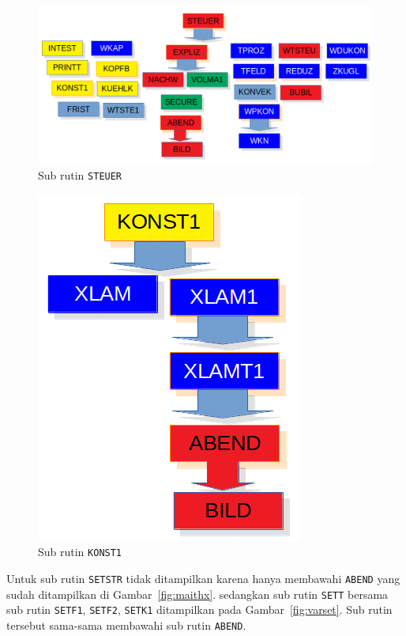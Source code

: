 \documentclass[a4paper,11pt]{report}
\renewcommand{\figurename}{Gambar}
\begin{document}
\begin{figure}[h!]
  \begin{center}
    \includegraphics[scale=.5]{../steuer.png}
    \caption{Sub rutin \texttt{STEUER}}
    \label{fig:steuer}
  \end{center}
\end{figure}

\begin{figure}[h!]
  \begin{center}
    \includegraphics[scale=.5]{../konst1.png}
    \caption{Sub rutin \texttt{KONST1}}
    \label{fig:konst1}
  \end{center}
\end{figure}

Untuk sub rutin \texttt{SETSTR} tidak ditampilkan karena hanya membawahi \texttt{ABEND} yang sudah ditampilkan di \figurename~\ref{fig:maithx}. sedangkan sub rutin \texttt{SETT} bersama sub rutin \texttt{SETF1}, \texttt{SETF2}, \texttt{SETK1} ditampilkan pada \figurename~\ref{fig:varset}. Sub rutin tersebut sama-sama membawahi sub rutin \texttt{ABEND}.
\end{document}
